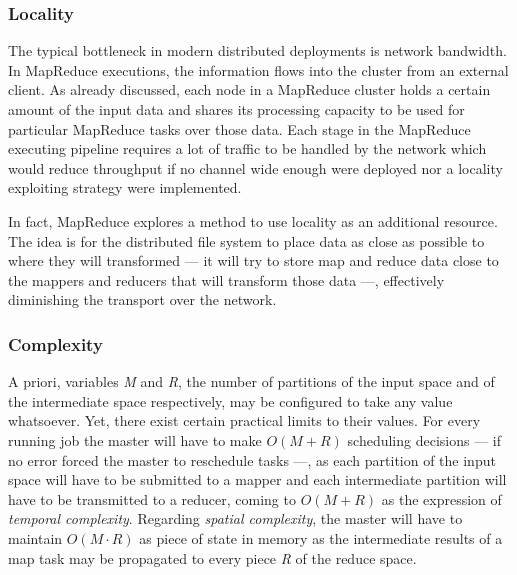 \subsubsection{Locality}\label{subsubsec:localidad}

\noindent The typical bottleneck in modern distributed deployments is network bandwidth. In MapReduce executions, the information flows into the cluster from an external client. As already discussed, each node in a MapReduce cluster holds a certain amount of the input data and shares its processing capacity to be used for particular MapReduce tasks over those data. Each stage in the MapReduce executing pipeline requires a lot of traffic to be handled by the network which would reduce throughput if no channel wide enough were deployed nor a locality exploiting strategy were implemented.

In fact, MapReduce explores a method to use locality as an additional resource. The idea is for the distributed file system to place data as close as possible to where they will transformed --- it will try to store map and reduce data close to the mappers and reducers that will transform those data ---, effectively diminishing the transport over the network.

\subsubsection{Complexity}\label{subsubsec:complejidad}
\noindent A priori, variables \emph{M} and \emph{R}, the number of partitions of the input space and of the intermediate space respectively, may be configured to take any value whatsoever. Yet, there exist certain practical limits to their values. For every running job the master will have to make $O(M + R)$ scheduling decisions --- if no error forced the master to reschedule tasks ---, as each partition of the input space will have to be submitted to a mapper and each intermediate partition will have to be transmitted to a reducer, coming to $O(M + R)$ as the expression of \emph{temporal complexity}. Regarding \emph{spatial complexity}, the master will have to maintain $O(M \cdot R)$ as piece of state in memory as the intermediate results of a map task may be propagated to every piece \emph{R} of the reduce space.

